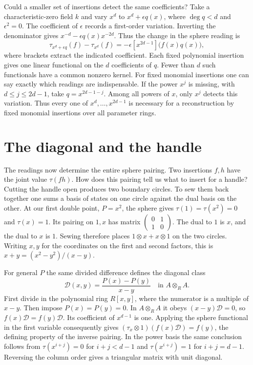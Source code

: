 \documentclass{momentum}
\begin{document}
Could a smaller set of insertions detect the same coefficients? Take
a characteristic-zero field \(k\) and vary \(x^d\) to
\(x^d+\epsilon q(x)\), where \(\deg q<d\) and \(\epsilon^2=0\).
The coefficient of \(\epsilon\) records a first-order variation.
Inverting the denominator gives \(x^{-d}-\epsilon q(x)x^{-2d}\).
Thus the change in the sphere reading is
\begin{equation}
 \tau_{x^d+\epsilon q}(f)-\tau_{x^d}(f)
   =-\epsilon [x^{2d-1}]\bigl(f(x)q(x)\bigr),
 \label{eq:tangent}
\end{equation}
where brackets extract the indicated coefficient. Each fixed polynomial
insertion gives one linear functional on the \(d\) coefficients of \(q\).
Fewer than \(d\) such functionals have a common nonzero kernel. For fixed
monomial insertions one can say exactly which readings are indispensable.
If the power \(x^j\) is missing, with \(d\le j\le2d-1\), take
\(q=x^{2d-1-j}\). Among all powers of \(x\), only \(x^j\) detects this
variation. Thus every one of \(x^d,\ldots,x^{2d-1}\) is necessary for a
reconstruction by fixed monomial insertions over all parameter rings.

\section{The diagonal and the handle}

The readings now determine the entire sphere pairing. Two insertions
\(f,h\) have the joint value \(\tau(fh)\). How does this pairing tell us
what to insert for a handle? Cutting the handle open produces two
boundary circles. To sew them back together one sums a basis of states
on one circle against the dual basis on the other. At our first double
point, \(P=x^2\), the sphere gives \(\tau(1)=\tau(x^2)=0\) and
\(\tau(x)=1\). Its pairing on \(1,x\) has matrix
\(\left(\begin{smallmatrix}0&1\\1&0\end{smallmatrix}\right)\).
The dual to \(1\) is \(x\), and the dual to \(x\) is \(1\). Sewing
therefore places \(1\otimes x+x\otimes1\) on the two circles.
Writing \(x,y\) for the coordinates on the first and second factors,
this is \(x+y=(x^2-y^2)/(x-y)\).

For general \(P\) the same divided difference defines the diagonal class
\[
 \mathcal D(x,y)=\frac{P(x)-P(y)}{x-y}\quad\text{in } A\otimes_R A .
\]
First divide in the polynomial ring \(R[x,y]\), where the numerator is
a multiple of \(x-y\). Then impose \(P(x)=P(y)=0\). In \(A\otimes_R A\)
it obeys \((x-y)\mathcal D=0\), so \(f(x)\mathcal D=f(y)\mathcal D\).
Its coefficient of \(x^{d-1}\) is one. Applying the sphere functional
in the first variable consequently gives
\((\tau_x\otimes1)(f(x)\mathcal D)=f(y)\), the defining property of
the inverse pairing. In the power basis the same conclusion follows
from \(\tau(x^{i+j})=0\) for \(i+j<d-1\) and
\(\tau(x^{i+j})=1\) for \(i+j=d-1\). Reversing the column order gives
a triangular matrix with unit diagonal.
\end{document}
